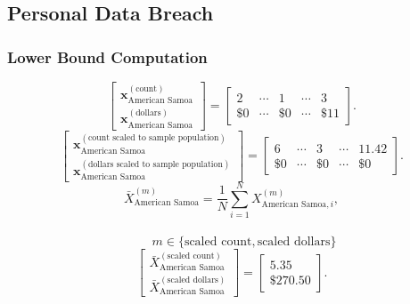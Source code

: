 \subsection{Personal Data Breach}\label{sec:persdatabreach}
\subsubsection{Lower Bound Computation}
\[
\begin{bmatrix}
\mathbf{x}_{\text{American Samoa}}^{(\text{count})}\\
\mathbf{x}_{\text{American Samoa}}^{(\text{dollars})}
\end{bmatrix}
=
\begin{bmatrix}
2 & \cdots & 1 & \cdots & 3\\
\$0 & \cdots & \$0 & \cdots & \$11
\end{bmatrix}.
\]
\[
\begin{bmatrix}
\mathbf{x}_{\text{American Samoa}}^{(\text{count scaled to sample population})}\\
\mathbf{x}_{\text{American Samoa}}^{(\text{dollars scaled to sample population})}
\end{bmatrix}
=
\begin{bmatrix}
6 & \cdots & 3 & \cdots & 11.42\\
\$0 & \cdots & \$0 & \cdots & \$0
\end{bmatrix}.
\]
  \[
\bar{X}_{\text{American Samoa}}^{(m)}
= \frac{1}{N}\sum_{i=1}^{N} X_{\text{American Samoa},i}^{(m)},
\]
\\
\[
\qquad
m \in \{\text{scaled count},\text{scaled dollars}\}
\]
\[
\begin{bmatrix}
\bar{X}_{\text{American Samoa}}^{(\text{scaled count})}\\
\bar{X}_{\text{American Samoa}}^{(\text{scaled dollars})}
\end{bmatrix}
=
\begin{bmatrix}
5.35\\
\$270.50
\end{bmatrix}.
\]
